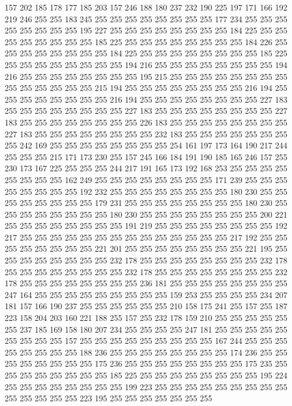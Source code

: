 157 202 185 178 177 185 203 157 246 188 180 237 232 190 225 197 171 166 192 219
246 255 255 183 245 255 255 255 255 255 255 255 255 177 234 255 255 255 255 255
255 255 255 195 227 255 255 255 255 255 255 255 255 184 225 255 255 255 255 255
255 255 255 185 225 255 255 255 255 255 255 255 255 184 226 255 255 255 255 255
255 255 255 184 225 255 255 255 255 255 255 255 255 185 225 255 255 255 255 255
255 255 255 194 216 255 255 255 255 255 255 255 255 194 216 255 255 255 255 255
255 255 255 195 215 255 255 255 255 255 255 255 255 255 255 255 255 255 255 215
194 255 255 255 255 255 255 255 255 216 194 255 255 255 255 255 255 255 255 216
194 255 255 255 255 255 255 255 255 227 183 255 255 255 255 255 255 255 255 227
183 255 255 255 255 255 255 255 255 227 183 255 255 255 255 255 255 255 255 226
183 255 255 255 255 255 255 255 255 227 183 255 255 255 255 255 255 255 255 232
183 255 255 255 255 255 255 255 255 242 169 255 255 255 255 255 255 255 255 254
161 197 173 164 190 217 244 255 255 255 215 171 173 230 255 157 245 166 184 191
190 185 165 246 157 255 230 173 167 225 255 255 255 244 217 191 165 173 192 168
253 255 255 255 255 255 255 255 255 162 249 255 255 255 255 255 255 255 255 171
239 255 255 255 255 255 255 255 255 192 232 255 255 255 255 255 255 255 255 180
230 255 255 255 255 255 255 255 255 179 231 255 255 255 255 255 255 255 255 180
230 255 255 255 255 255 255 255 255 180 230 255 255 255 255 255 255 255 255 200
221 255 255 255 255 255 255 255 255 191 219 255 255 255 255 255 255 255 255 192
217 255 255 255 255 255 255 255 255 255 255 255 255 255 255 217 192 255 255 255
255 255 255 255 255 221 201 255 255 255 255 255 255 255 255 221 195 255 255 255
255 255 255 255 255 232 178 255 255 255 255 255 255 255 255 232 178 255 255 255
255 255 255 255 255 232 178 255 255 255 255 255 255 255 255 232 178 255 255 255
255 255 255 255 255 236 181 255 255 255 255 255 255 255 255 247 164 255 255 255
255 255 255 255 255 255 159 253 255 255 255 255 234 207 181 157 166 190 237 255
255 255 255 255 255 210 158 175 241 255 157 255 187 223 158 204 203 160 221 188
255 157 255 232 178 159 210 255 255 255 255 255 255 237 185 169 158 180 207 234
255 255 255 255 247 181 255 255 255 255 255 255 255 255 255 157 255 255 255 255
255 255 255 255 255 167 244 255 255 255 255 255 255 255 255 188 236 255 255 255
255 255 255 255 255 174 236 255 255 255 255 255 255 255 255 175 236 255 255 255
255 255 255 255 255 175 235 255 255 255 255 255 255 255 255 185 225 255 255 255
255 255 255 255 255 195 224 255 255 255 255 255 255 255 255 199 223 255 255 255
255 255 255 255 255 255 255 255 255 255 255 223 195 255 255 255 255 255 255 255
